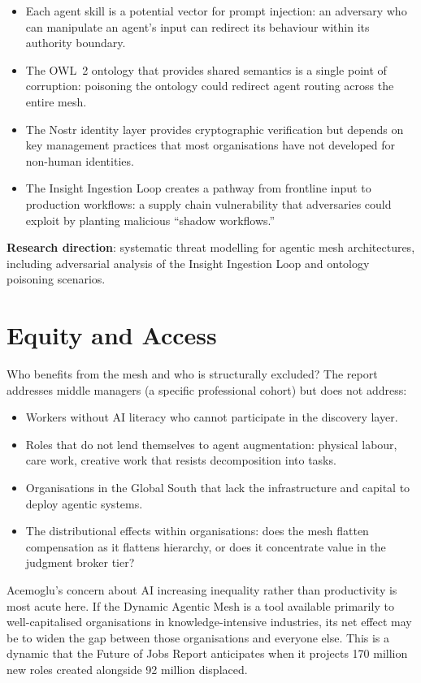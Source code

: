 \begin{itemize}
  \item Each agent skill is a potential vector for prompt injection: an adversary who can manipulate an agent's input can redirect its behaviour within its authority boundary.
  \item The OWL~2 ontology that provides shared semantics is a single point of corruption: poisoning the ontology could redirect agent routing across the entire mesh.
  \item The Nostr identity layer provides cryptographic verification but depends on key management practices that most organisations have not developed for non-human identities.
  \item The Insight Ingestion Loop creates a pathway from frontline input to production workflows: a supply chain vulnerability that adversaries could exploit by planting malicious ``shadow workflows.''
\end{itemize}

\textbf{Research direction}: systematic threat modelling for agentic mesh architectures, including adversarial analysis of the Insight Ingestion Loop and ontology poisoning scenarios.

\section{Equity and Access}

Who benefits from the mesh and who is structurally excluded? The report addresses middle managers (a specific professional cohort) but does not address:

\begin{itemize}
  \item Workers without AI literacy who cannot participate in the discovery layer.
  \item Roles that do not lend themselves to agent augmentation: physical labour, care work, creative work that resists decomposition into tasks.
  \item Organisations in the Global South that lack the infrastructure and capital to deploy agentic systems.
  \item The distributional effects within organisations: does the mesh flatten compensation as it flattens hierarchy, or does it concentrate value in the judgment broker tier?
\end{itemize}

Acemoglu's concern about AI increasing inequality rather than productivity is most acute here. If the Dynamic Agentic Mesh is a tool available primarily to well-capitalised organisations in knowledge-intensive industries, its net effect may be to widen the gap between those organisations and everyone else. This is a dynamic that the \textcite{WEF2025} Future of Jobs Report anticipates when it projects 170 million new roles created alongside 92 million displaced.

